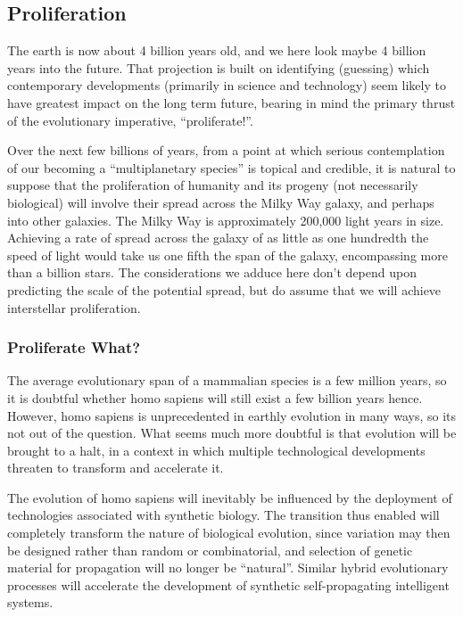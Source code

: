 \documentclass[10pt,titlepage]{article}
\begin{document}
{\subsection{Proliferation}

The earth is now about 4 billion years old, and we here look maybe 4 billion years into the future.
That projection is built on identifying (guessing) which contemporary developments (primarily in science and technology) seem likely to have greatest impact on the long term future, bearing in mind the primary thrust of the evolutionary imperative, ``proliferate!''.

Over the next few billions of years, from a point at which serious contemplation of our becoming a ``multiplanetary species'' is topical and credible, it is natural to suppose that the proliferation of humanity and its progeny (not necessarily biological) will involve their spread across the Milky Way galaxy, and perhaps into other galaxies.
The Milky Way is approximately 200,000 light years in size.
Achieving a rate of spread across the galaxy of as little as one hundredth the speed of light would take us one fifth the span of the galaxy, encompassing more than a billion stars.
The considerations we adduce here don't depend upon predicting the scale of the potential spread, but do assume that we will achieve interstellar proliferation.

\cite{sandberg-sme}

\subsubsection{Proliferate What?}

The average evolutionary span of a mammalian species is a few million years, so it is doubtful  whether homo sapiens will still exist a few billion years hence.
However, homo sapiens is unprecedented in earthly evolution in many ways, so its not out of the question.
What seems much more doubtful is that evolution will be brought to a halt, in a context in which multiple technological developments threaten to transform and accelerate it.

The evolution of homo sapiens will inevitably be influenced by the deployment of technologies associated with synthetic biology.
The transition thus enabled will completely transform the nature of biological evolution, since variation may then be designed rather than random or combinatorial, and selection of genetic material for propagation will no longer be ``natural''.
Similar hybrid evolutionary processes will accelerate the development of synthetic self-propagating intelligent systems. 

}
\end{document}
